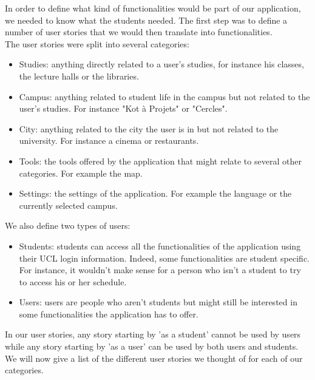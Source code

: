 \documentclass{eplmastersthesis}
\begin{document}
In order to define what kind of functionalities would be part of our application, we needed to know what the students needed. The first step was to define a number of user stories that we would then translate into functionalities.\\ 
The user stories were split into several categories:

\begin{itemize}

\item Studies: anything directly related to a user's studies, for instance his classes, the lecture halls or the libraries.
\item Campus: anything related to student life in the campus but not related to the user's studies. For instance "Kot à Projets" or "Cercles".
\item City: anything related to the city the user is in but not related to the university. For instance a cinema or restaurants.
\item Tools: the tools offered by the application that might relate to several other categories. For example the map.
\item Settings: the settings of the application. For example the language or the currently selected campus.

\end{itemize}

We also define two types of users:

\begin{itemize}

\item Students: students can access all the functionalities of the application using their UCL login information. Indeed, some functionalities are student specific. For instance, it wouldn't make sense for a person who isn't a student to try to access his or her schedule.

\item Users: users are people who aren't students but might still be interested in some functionalities the application has to offer. 

\end{itemize}

In our user stories, any story starting by 'as a student' cannot be used by users while any story starting by 'as a user' can be used by both users and students.\\

We will now give a list of the different user stories we thought of for each of our categories.
\end{document}
